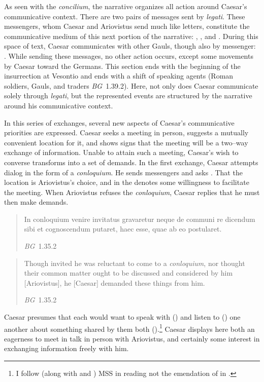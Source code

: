 \documentclass[12pt,letterpaper,oneside,final]{memoir}
\begin{document}
As seen with the \emph{concilium}, the narrative organizes all action around Caesar's communicative context. There are two pairs of messages sent by \emph{legati}. These messengers, whom Caesar and Ariovistus send much like letters, constitute the communicative medium of this next portion of the narrative: , , and . During this space of text, Caesar communicates with other Gauls, though also by messenger: . While sending these messages, no other action occurs, except some movements by Caesar toward the Germans. This section ends with the beginning of the insurrection at Vesontio and ends with a shift of speaking agents (Roman soldiers, Gauls, and traders \emph{BG}~1.39.2). Here, not only does Caesar communicate solely through \emph{legati}, but the represented events are structured by the narrative around his communicative context.

In this series of exchanges, several new aspects of Caesar's communicative priorities are expressed. Caesar seeks a meeting in person, suggests a mutually convenient location for it, and shows signs that the meeting will be a two--way exchange of information. Unable to attain such a meeting, Caesar's wish to converse transforms into a set of demands. In the first exchange, Caesar attempts dialog in the form of a \emph{conloquium}. He sends messengers and asks . That the location is Ariovistus's choice, and in the  denotes some willingness to facilitate the meeting. When Ariovistus refuses the \emph{conloquium}, Caesar replies that he must then make demands. \blockquote[\emph{BG}~1.35.2]{\textlatin{In conloquium venire invitatus gravaretur neque de communi re dicendum sibi et cognoscendum putaret, haec esse, quae ab eo postularet.}} \blockquote[\emph{BG}~1.35.2]{Though invited he was reluctant to come to a \emph{\textlatin{conloquium}}, nor thought their common matter ought to be discussed and considered by him [Ariovistus], he [Caesar] demanded these things from him.} Caesar presumes that each would want to speak with () and listen to () one another about something shared by them both ().\footnote{I follow (along with \cite{klotz1926} and \cite{seel1961}) MSS in reading  not the emendation of  in \textcite{hering2008}.} Caesar displays here both an eagerness to meet in talk in person with Ariovistus, and certainly some interest in exchanging information freely with him.
\end{document}
